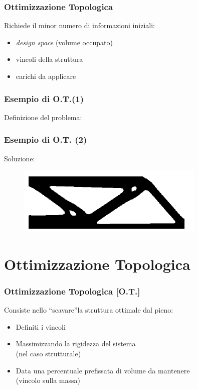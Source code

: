 \documentclass{beamer}
\begin{document}
\begin{frame}
	\frametitle{Ottimizzazione Topologica}
	Richiede il minor numero di informazioni iniziali:
	\begin{itemize}
		\item \textit{design space} (volume occupato)
		\item vincoli della struttura
		\item carichi da applicare
	\end{itemize}
\end{frame}

\begin{frame}
	\frametitle{Esempio di O.T.(1)}
	Definizione del problema:
	\label{fig:schema_to}

\end{frame}


\begin{frame}
	\frametitle{Esempio di O.T. (2)}
	Soluzione:
	\begin{figure}
		\centering
		\includegraphics[width=0.8\textwidth]{./images/beam_2d_reci_gsf_fine_100.png}
		\label{fig:sol_to}
	\end{figure}
\end{frame}


\section{Ottimizzazione Topologica}

\begin{frame}
	\frametitle{Ottimizzazione Topologica [O.T.]}
	Consiste nello \textquotedblleft scavare\textquotedblright la struttura ottimale dal pieno:
	\begin{itemize}
		\item Definiti i vincoli
		\item Massimizzando la rigidezza del sistema \\ (nel caso strutturale)
		\item Data una percentuale prefissata di volume da mantenere \\ (vincolo sulla massa)
	\end{itemize}
\end{frame}
\end{document}
